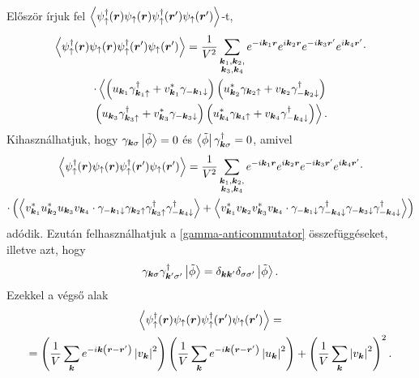 \documentclass[a4paper,12pt,titlepage]{article}
\newcommand{\KK}{{\vb*{k}}}
\newcommand{\RR}{{\vb*{r}}}
\begin{document}
Először írjuk fel $\left< \psi_\uparrow^\dagger(\RR) \psi_\uparrow(\RR) \psi_\uparrow^\dagger(\RR^\prime) \psi_\uparrow(\RR^\prime) \right>$-t,
\begin{multline}
	\left< \psi_\uparrow^\dagger(\RR) \psi_\uparrow(\RR) \psi_\uparrow^\dagger(\RR^\prime) \psi_\uparrow(\RR^\prime) \right> = \frac{1}{V^2} \sum\limits_{\substack{\KK_1, \KK_2, \\ \KK_3, \KK_4}} e^{-i \KK_1 \RR} e^{i \KK_2 \RR} e^{-i \KK_3 \RR^\prime} e^{i \KK_4 \RR^\prime} \cdot \\
	\cdot \left< \left( u_{\KK_1} \gamma_{\KK_1 \uparrow}^\dagger + v_{\KK_1}^* \gamma_{-\KK_1 \downarrow} \right) \left( u_{\KK_2}^* \gamma_{\KK_2 \uparrow} + v_{\KK_2} \gamma_{-\KK_2 \downarrow}^\dagger \right)
	\right. \\ \left.
	\left( u_{\KK_3} \gamma_{\KK_3 \uparrow}^\dagger + v_{\KK_3}^* \gamma_{-\KK_3 \downarrow} \right) \left( u_{\KK_4}^* \gamma_{\KK_4 \uparrow} + v_{\KK_4} \gamma_{-\KK_4 \downarrow}^\dagger \right) \right>.
\end{multline}
Kihasználhatjuk, hogy $\gamma_{\KK \sigma} \ket{\tilde{\phi}} = 0$ és $\bra{\tilde{\phi}} \gamma_{\KK \sigma}^\dagger = 0$, amivel
\begin{multline}
	\left< \psi_\uparrow^\dagger(\RR) \psi_\uparrow(\RR) \psi_\uparrow^\dagger(\RR^\prime) \psi_\uparrow(\RR^\prime) \right> = \frac{1}{V^2} \sum\limits_{\substack{\KK_1, \KK_2, \\ \KK_3, \KK_4}} e^{-i \KK_1 \RR} e^{i \KK_2 \RR} e^{-i \KK_3 \RR^\prime} e^{i \KK_4 \RR^\prime} \cdot \\
	\cdot \left( \left< v_{\KK_1}^* u_{\KK_2}^* u_{\KK_3} v_{\KK_4} \cdot \gamma_{-\KK_1 \downarrow} \gamma_{\KK_2 \uparrow} \gamma_{\KK_3 \uparrow}^\dagger \gamma_{-\KK_4 \downarrow}^\dagger \right> + \left< v_{\KK_1}^* v_{\KK_2} v_{\KK_3}^* v_{\KK_4} \cdot \gamma_{-\KK_1 \downarrow} \gamma_{-\KK_4 \downarrow}^\dagger \gamma_{-\KK_3 \downarrow} \gamma_{-\KK_4 \downarrow}^\dagger \right> \right)
\end{multline}
adódik.  Ezután felhasználhatjuk a \eqref{gamma-anticommutator} összefüggéseket, illetve azt, hogy
$$ \gamma_{\KK \sigma} \gamma_{\KK^\prime \sigma^\prime}^\dagger \ket{\tilde{\phi}} = \delta_{\KK \KK^\prime} \delta_{\sigma \sigma^\prime} \ket{\tilde{\phi}}. $$
Ezekkel a végső alak
\begin{multline}
	\left< \psi_\uparrow^\dagger(\RR) \psi_\uparrow(\RR) \psi_\uparrow^\dagger(\RR^\prime) \psi_\uparrow(\RR^\prime) \right> = \\
	= \left( \frac{1}{V} \sum\limits_\KK e^{-i \KK \left( \RR - \RR^\prime \right)} \left| v_\KK \right|^2 \right) \left( \frac{1}{V} \sum\limits_\KK e^{-i \KK \left( \RR - \RR^\prime \right)} \left| u_\KK \right|^2 \right) + \left( \frac{1}{V} \sum\limits_\KK \left| v_\KK \right|^2 \right)^2.
\end{multline}
\end{document}
